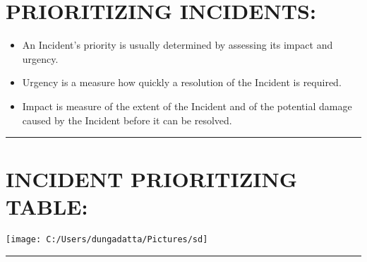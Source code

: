 \documentclass[10pt,british,english]{article}
\begin{document}
\section{PRIORITIZING INCIDENTS:}
\begin{itemize}
\item An Incident's priority is usually determined by assessing its impact
and urgency.
\item Urgency is a measure how quickly a resolution of the Incident is required.
\item Impact is measure of the extent of the Incident and of the potential
damage caused by the Incident before it can be resolved.
\end{itemize}
\rule[0.5ex]{1\columnwidth}{1pt}

\section{INCIDENT PRIORITIZING TABLE:}

\texttt{[image: C:/Users/dungadatta/Pictures/sd]}

\rule[0.5ex]{1\columnwidth}{1pt}
\end{document}
